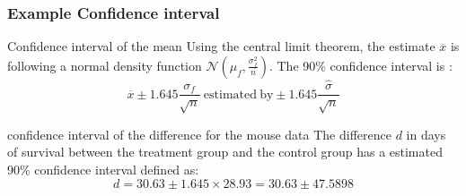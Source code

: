 \frame
{
\frametitle{Example Confidence interval}

\begin{exampleblock}{Confidence interval of the mean}
Using the central limit theorem, the estimate  $\overline{x}$ is following a normal density function $\mathcal{N}\left(\mu_f,\frac{\sigma_f^2}{n}\right)$.
The 90\% confidence interval is :
$$
\overline{x}\pm 1.645 \frac{\sigma_f}{\sqrt{n}}\  \mathrm{estimated\ by} \pm 1.645 \frac{\hat{\sigma}}{\sqrt{n}}
$$
\end{exampleblock}

\begin{exampleblock}{confidence interval of the difference for the mouse data}
The difference $d$ in days of survival between the treatment group and the control group has a estimated 90\% confidence interval defined as:
$$
 d=30.63\pm  1.645\times 28.93=30.63 \pm 47.5898 
$$
\end{exampleblock}
}




